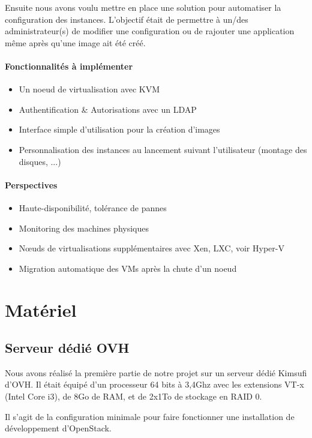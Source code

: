 \documentclass[a4paper,oneside]{report}
\begin{document}
Ensuite nous avons voulu mettre en place une solution pour automatiser la configuration des instances.
L'objectif était de permettre à un/des administrateur(s) de modifier une configuration ou de rajouter une application même après qu'une image ait été créé.

\subsubsection{Fonctionnalités à implémenter}
\begin{itemize}
\item Un noeud de \gls{virtualisation} avec KVM
\item Authentification \& Autorisations avec un LDAP
\item Interface simple d'utilisation pour la création d'images
\item Personnalisation des instances au lancement suivant l'utilisateur (montage des disques, ...)
\end{itemize}

\subsubsection{Perspectives}
\begin{itemize}
\item Haute-disponibilité, tolérance de pannes
\item Monitoring des machines physiques
\item Nœuds de \gls{virtualisation}s supplémentaires avec Xen, LXC, voir Hyper-V
\item Migration automatique des VMs après la chute d'un noeud
\end{itemize}


\chapter{Matériel}

\section{Serveur dédié OVH}
Nous avons réalisé la première partie de notre projet sur un serveur dédié Kimsufi d'OVH.
Il était équipé d'un processeur 64 bits à 3,4Ghz avec les extensions VT-x (Intel Core i3), de 8Go de RAM, et de 2x1To de stockage en RAID 0.

Il s'agit de la configuration minimale pour faire fonctionner une installation de développement d'OpenStack.
\end{document}
